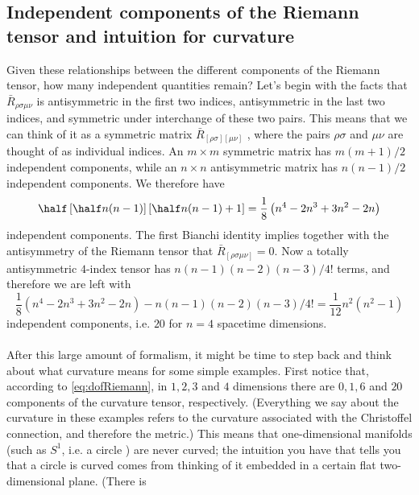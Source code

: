\subsection{Independent components of the Riemann tensor and intuition for curvature}
Given these relationships between the different components of the Riemann tensor, how
many independent quantities remain? Let’s begin with the facts that $\bar{R}_{ρσμν}$ is antisymmetric
in the first two indices, antisymmetric in the last two indices, and symmetric under interchange of these two pairs. This means that we can think of it as a symmetric matrix $\bar{R}_{[ρσ][μν]}$ ,
where the pairs $ρσ$ and $μν$ are thought of as individual indices. An $ m × m$ symmetric matrix has $m(m + 1)/2$ independent components, while an $n × n$ antisymmetric matrix has
$n(n − 1)/2$ independent components. We therefore have
\begin{equation}
	\half \left[\half n(n-1)\right]\left[\half n(n-1) +1\right] = \frac{1}{8} \left(n^4-2n^3+3n^2- 2n\right)
\end{equation}
independent components. The first Bianchi identity implies together with the antisymmetry of the Riemann tensor that $\bar{R}_{[\rho\sigma\mu\nu]}=0$.
Now a totally antisymmetric $4$-index tensor has $n(n−1)(n−2)(n−3)/4!$ terms, and therefore we are left with
\begin{equation}
\label{eq:dofRiemann}
	 \frac{1}{8} \left(n^4-2n^3+3n^2- 2n\right)-n(n−1)(n−2)(n−3)/4! = \frac{1}{12} n^2 (n^2-1)
\end{equation}
independent components, i.e. $20$ for $n=4$ spacetime dimensions.\\
\\
After this large amount of formalism, it might be time to step back and think about what
curvature means for some simple examples. First notice that, according to \ref{eq:dofRiemann}, in $1, 2, 3$
and $4$ dimensions there are $0, 1, 6$ and $20$ components of the curvature tensor, respectively.
(Everything we say about the curvature in these examples refers to the curvature associated
with the Christoffel connection, and therefore the metric.) This means that one-dimensional
manifolds (such as $S^1$, i.e. a circle ) are never curved; the intuition you have that tells you that a circle is
curved comes from thinking of it embedded in a certain flat two-dimensional plane. (There is
